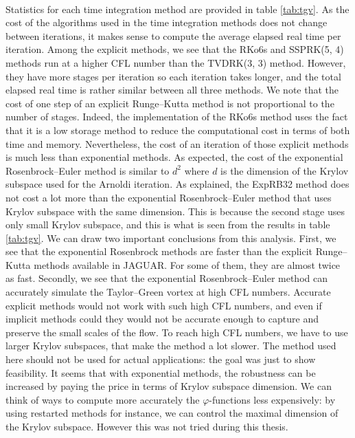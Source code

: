       \paragraph{}
      Statistics for each time integration method are provided in table \ref{tab:tgv}.
      As the cost of the algorithms used in the time integration methods does not change between iterations, it makes sense to compute the average elapsed real time per iteration.
      Among the explicit methods, we see that the RKo6s and SSPRK(5, 4) methods run at a higher CFL number than the TVDRK(3, 3) method.
      However, they have more stages per iteration so each iteration takes longer, and the total elapsed real time is rather similar between all three methods.
      We note that the cost of one step of an explicit Runge--Kutta method is not proportional to the number of stages.
      Indeed, the implementation of the RKo6s method uses the fact that it is a low storage method to reduce the computational cost in terms of both time and memory.
      Nevertheless, the cost of an iteration of those explicit methods is much less than exponential methods.
      As expected, the cost of the exponential Rosenbrock--Euler method is similar to $d^2$ where $d$ is the dimension of the Krylov subspace used for the Arnoldi iteration.
      As explained, the ExpRB32 method does not cost a lot more than the exponential Rosenbrock--Euler method that uses Krylov subspace with the same dimension.
      This is because the second stage uses only small Krylov subspace, and this is what is seen from the results in table \ref{tab:tgv}.
      We can draw two important conclusions from this analysis.
      First, we see that the exponential Rosenbrock methods are faster than the explicit Runge--Kutta methods available in JAGUAR.
      For some of them, they are almost twice as fast.
      Secondly, we see that the exponential Rosenbrock--Euler method can accurately simulate the Taylor--Green vortex at high CFL numbers.
      Accurate explicit methods would not work with such high CFL numbers, and even if implicit methods could they would not be accurate enough to capture and preserve the small scales of the flow.
      To reach high CFL numbers, we have to use larger Krylov subspaces, that make the method a lot slower.
      The method used here should not be used for actual applications: the goal was just to show feasibility.
      It seems that with exponential methods, the robustness can be increased by paying the price in terms of Krylov subspace dimension.
      We can think of ways to compute more accurately the $\varphi$-functions less expensively: by using restarted methods for instance, we can control the maximal dimension of the Krylov subspace.
      However this was not tried during this thesis.

